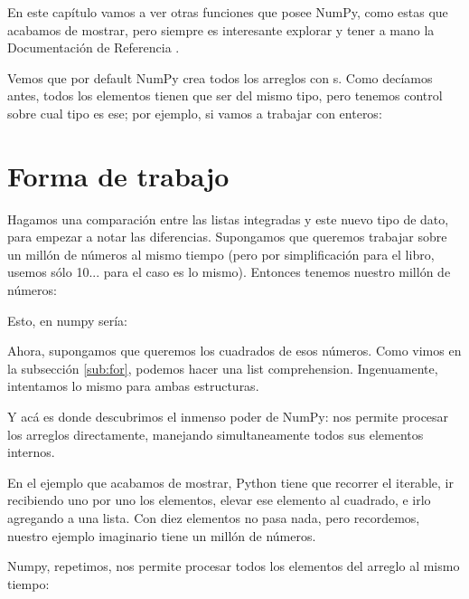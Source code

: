 
En este capítulo vamos a ver otras funciones que posee NumPy, como estas que acabamos de mostrar, pero siempre es interesante explorar y tener a mano la Documentación de Referencia \cite{numpy_referencia}.

Vemos que por default NumPy crea todos los arreglos con s. Como decíamos antes, todos los elementos tienen que ser del mismo tipo, pero tenemos control sobre cual tipo es ese; por ejemplo, si vamos a trabajar con enteros:



\section{Forma de trabajo}

Hagamos una comparación entre las listas integradas y este nuevo tipo de dato, para empezar a notar las diferencias. Supongamos que queremos trabajar sobre un millón de números al mismo tiempo (pero por simplificación para el libro, usemos sólo 10... para el caso es lo mismo). Entonces tenemos nuestro millón de números:


Esto, en numpy sería:


Ahora, supongamos que queremos los cuadrados de esos números. Como vimos en la subsección \ref{sub:for}, podemos hacer una list comprehension. Ingenuamente, intentamos lo mismo para ambas estructuras.


Y acá es donde descubrimos el inmenso poder de NumPy: nos permite procesar los arreglos directamente, manejando simultaneamente todos sus elementos internos.

En el ejemplo que acabamos de mostrar, Python tiene que recorrer el iterable, ir recibiendo uno por uno los elementos, elevar ese elemento al cuadrado, e irlo agregando a una lista. Con diez elementos no pasa nada, pero recordemos, nuestro ejemplo imaginario tiene un millón de números.

Numpy, repetimos, nos permite procesar todos los elementos del arreglo al mismo tiempo:


